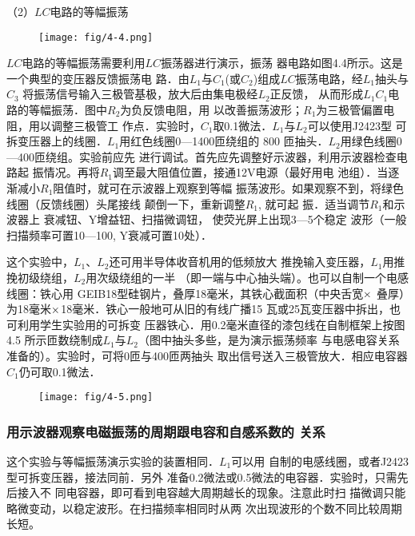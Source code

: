 （2）$LC$电路的等幅振荡

\begin{figure}[htp]
    \centering
\texttt{[image: fig/4-4.png]}
    \caption{}
\end{figure}

$LC$电路的等幅振荡需要利用$LC$振荡器进行演示，振荡
器电路如图4.4所示。这是一个典型的变压器反馈振荡电
路．由$L_1$与$C_1$(或$C_2$)组成$LC$振荡电路，经$L_1$抽头与$C_3$
将振荡信号输入三极管基极，放大后由集电极经$L_2$正反馈，
从而形成$L_1C_1$电路的等幅振荡．图中$R_2$为负反馈电阻，用
以改善振荡波形；$R_1$为三极管偏置电阻，用以调整三极管工
作点．实验时，$C_1$取0.1微法．$L_1$与$L_2$可以使用J2423型
可拆变压器上的线圈．$L_1$用红色线圈0—1400匝绕组的
800 匝抽头．$L_2$用绿色线圈0—400匝绕组。实验前应先
进行调试。首先应先调整好示波器，利用示波器检查电路起
振情况。再将$R_1$调至最大阻值位置，接通12V电源（最好用电
池组）．当逐渐减小$R_1$阻值时，就可在示波器上观察到等幅
振荡波形。如果观察不到，将绿色线圈（反馈线圈）头尾接线
颠倒一下，重新调整$R_1$, 就可起
振．适当调节$R_1$和示波器上
衰减钮、Y增益钮、扫描微调钮，
使荧光屏上出现3—5个稳定
波形（一般扫描频率可置10—100, Y衰减可置10处）．

这个实验中，$L_1$、$L_2$还可用半导体收音机用的低频放大
推挽输入变压器，$L_1$用推挽初级绕组，$L_2$用次级绕组的一半
（即一端与中心抽头端）。也可以自制一个电感线圈：铁心用
GEIB18型硅钢片，叠厚18毫米，其铁心截面积（中央舌宽$\times$
叠厚）为18毫米$\times$18毫米．铁心一般地可从旧的有线广播15
瓦或25瓦变压器中拆出，也可利用学生实验用的可拆变
压器铁心．用0.2毫米直径的漆包线在自制框架上按图4.5
所示匝数绕制成$L_1$与$L_2$（图中抽头多些，是为演示振荡频率
与电感电容关系准备的）。实验时，可将0匝与400匝两抽头
取出信号送入三极管放大．相应电容器$C_1$仍可取0.1微法．

\begin{figure}[htp]
    \centering
\texttt{[image: fig/4-5.png]}
    \caption{}
\end{figure}

\subsubsection{用示波器观察电磁振荡的周期跟电容和自感系数的
关系}

这个实验与等幅振荡演示实验的装置相同．$L_1$可以用
自制的电感线圈，或者J2423型可拆变压器，接法同前．另外
准备0.2微法或0.5微法的电容器．实验时，只需先后接入不
同电容器，即可看到电容越大周期越长的现象。注意此时扫
描微调只能略微变动，以稳定波形。在扫描频率相同时从两
次出现波形的个数不同比较周期长短。

